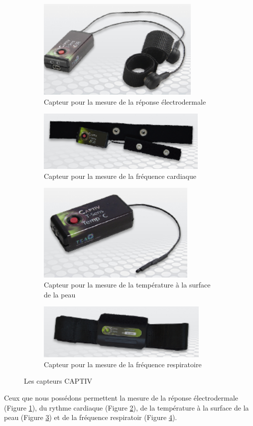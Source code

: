 \documentclass[11pt]{article}
\begin{document}
			\begin{figure}
				\begin{subfigure}{0.5\textwidth}
					\centering
					\includegraphics[scale=0.5]{../include/TEAgsr.PNG}
					\caption{Capteur pour la mesure de la réponse électrodermale}
					\label{fig:gsr}
				\end{subfigure}
				\begin{subfigure}{0.5\textwidth}
					\centering
					\includegraphics[scale=0.5]{../include/TEAhr.PNG}
					\caption{Capteur pour la mesure de la fréquence cardiaque}
					\label{fig:hr}
				\end{subfigure}\newline
				\begin{subfigure}{0.5\textwidth}
					\centering
					\includegraphics[scale=0.5]{../include/TEAbt.PNG}
					\caption{Capteur pour la mesure de la température à la surface de la peau}
					\label{fig:bt}
				\end{subfigure}
				\begin{subfigure}{0.5\textwidth}
					\centering
					\includegraphics[scale=0.5]{../include/TEArr.PNG}
					\caption{Capteur pour la mesure de la fréquence respiratoire}
					\label{fig:rr}
				\end{subfigure}
				\caption{Les capteurs CAPTIV}
				\label{fig:capteurstea}
			\end{figure}
			Ceux que nous possédons permettent la mesure de la réponse électrodermale (Figure \ref{fig:gsr}), du rythme cardiaque (Figure \ref{fig:hr}), de la température à la surface de la peau (Figure \ref{fig:bt}) et de la fréquence respiratoir (Figure \ref{fig:rr}).
\end{document}
